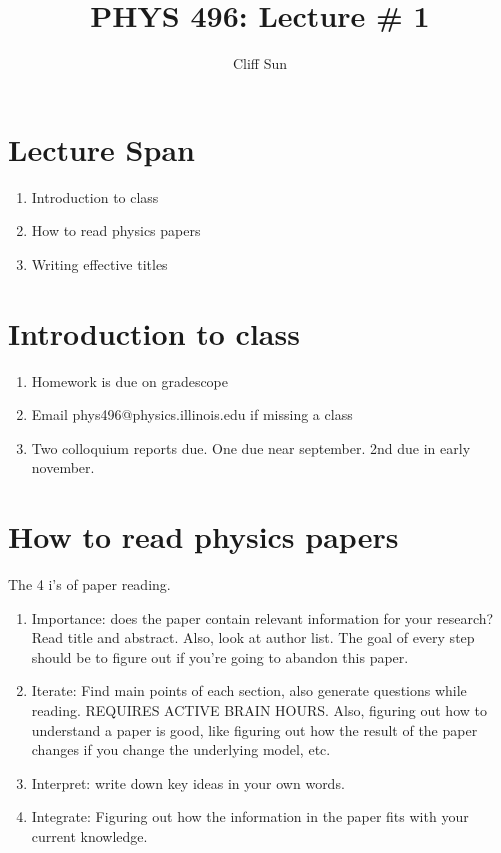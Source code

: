 \documentclass{article}
\title{PHYS 496: Lecture \# 1}
\author{Cliff Sun}
\newtheorem{one minute paper}[theorem]{One Minute Paper}
\begin{document}
\maketitle

\section*{Lecture Span}
\begin{enumerate}
    \item Introduction to class
    \item How to read physics papers
    \item Writing effective titles
\end{enumerate}

\section*{Introduction to class}

\begin{enumerate}
    \item Homework is due on gradescope
    \item Email phys496@physics.illinois.edu if missing a class
    \item Two colloquium reports due. One due near september. 2nd due in early november. 
\end{enumerate}

\section*{How to read physics papers}

The 4 i's of paper reading. 

\begin{enumerate}
    \item Importance: does the paper contain relevant information for your research? Read title and abstract. Also, look at author list. The goal of every step should be to figure out if you're going to abandon this paper.
    \item Iterate: Find main points of each section, also generate questions while reading. REQUIRES ACTIVE BRAIN HOURS.
    Also, figuring out how to understand a paper is good, like figuring out how the result of the paper changes if you change the underlying model, etc.    
    \item Interpret: write down key ideas in your own words.
    \item Integrate: Figuring out how the information in the paper fits with your current knowledge.  
\end{enumerate}
\end{document}
